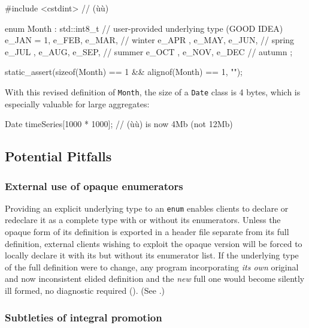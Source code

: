 \begin{emcppslisting}
#include <cstdint>  // (ù{}ù)

enum Month : std::int8_t  // user-provided underlying type (GOOD IDEA)
{
    e_JAN = 1, e_FEB, e_MAR,    // winter
    e_APR    , e_MAY, e_JUN,    // spring
    e_JUL    , e_AUG, e_SEP,    // summer
    e_OCT    , e_NOV, e_DEC     // autumn
};

static_assert(sizeof(Month) == 1 && alignof(Month) == 1, "");
\end{emcppslisting}

\noindent With this revised definition of \lstinline!Month!, the size of a
\lstinline!Date! class is 4 bytes, which is especially valuable for large
aggregates:

\begin{emcppslisting}[emcppsbatch=e1]
Date timeSeries[1000 * 1000];  // (ù{}ù) is now 4Mb (not 12Mb)
\end{emcppslisting}


\subsection[Potential Pitfalls]{Potential Pitfalls}\label{potential-pitfalls-underlyingenum}

\subsubsection[External use of opaque enumerators]{External use of opaque enumerators}\label{external-use-of-opaque-enumerators-enumunderlying}

Providing an explicit underlying type to an \lstinline!enum! enables
clients to declare or redeclare it as a complete type with or without
its enumerators. Unless the opaque form of its definition is exported in
a header file separate from its full definition, external clients
wishing to exploit the opaque version will be forced to locally declare
it with its  but without its enumerator list. If
the underlying type of the full definition were to change, any program
incorporating \emph{its own} original and now inconsistent elided
definition and the \emph{new} full one would become silently ill formed, no diagnostic required (). (See .)

\subsubsection[Subtleties of integral promotion]{Subtleties of integral promotion}\label{subtleties-of-integral-promotion}

